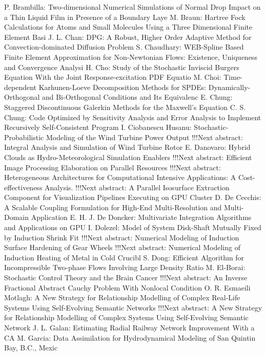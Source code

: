 \documentclass[10pt, A4]{article}%
\begin{document}
{P. Brambilla}: {Two-dimensional Numerical Simulations of Normal Drop Impact on a Thin Liquid Film in Presence of a Boundary Laye}
{M. Braun}: {Hartree Fock Calculations for Atoms and Small Molecules Using  a Three Dimensional  Finite Element Basi}
{J. L. Chan}: {DPG: A Robust, Higher Order Adaptive Method for Convection-dominated Diffusion Problem}
{S. Chaudhary}: {WEB-Spline Based Finite Element Approximation for Non-Newtonian Flows: Existence, Uniqueness and Convergence Analysi}
{H. Cho}: {Study of the Stochastic Inviscid Burgers Equation With the Joint Response-excitation PDF Equatio}
{M. Choi}: {Time-dependent Karhunen-Loeve Decomposition Methods for SPDEs: Dynamically-Orthogonal and Bi-Orthogonal Conditions and Its Equivalenc}
{E. Chung}: {Staggered Discontinuous Galerkin Methods for the Maxwell's Equation}
{C. S. Chung}: {Code Optimized by Sensitivity Analysis and Error Analysis to Implement Recursively Self-Consistent Program}
{I. Ciobanescu Husanu}: {Stochastic-Probabilistic Modeling of the Wind Turbine Power Output      !!!Next abstract: Integral Analysis and Simulation of Wind Turbine Rotor}
{E. Danovaro}: {Hybrid Clouds as Hydro-Meteorological Simulation Enablers      !!!Next abstract: Efficient Image Processing Elaboration on Parallel Resources      !!!Next abstract: Heterogeneous Architectures for Computational Intensive Applications: A Cost-effectiveness Analysis.      !!!Next abstract: A Parallel Isosurface Extraction Component for Visualization Pipelines Executing on GPU Cluster}
{D. De Cecchis}: {A Scalable Coupling Formulation for High-End Multi-Resolution and Multi-Domain Application}
{E. H. J. De Doncker}: {Multivariate Integration Algorithms and Applications on GPU}
{I. Dolezel}: {Model of System Disk-Shaft Mutually Fixed by Induction Shrink Fit      !!!Next abstract: Numerical Modeling of Induction Surface Hardening of Gear Wheels      !!!Next abstract: Numerical Modeling of Induction Heating of Metal in Cold Crucibl}
{S. Dong}: {Efficient Algorithm for Incompressible Two-phase Flows Involving Large Density Ratio}
{M. El-Borai}: {Stochastic Control Theory and the Brain Cancer      !!!Next abstract: An Inverse Fractional Abstract Cauchy Problem With Nonlocal Condition}
{O. R. Esmaeili Motlagh}: {A New Strategy for Relationship Modelling of Complex Real-Life Systems Using Self-Evolving Semantic Networks      !!!Next abstract: A New Strategy for Relationship Modelling of Complex Systems Using Self-Evolving Semantic Network}
{J. L. Galan}: {Estimating Radial Railway Network Improvement With a CA}
{M. Garcia}: {Data Assimilation for Hydrodynamical Modeling of San Quintin Bay, B.C., Mexic}
\end{document}
